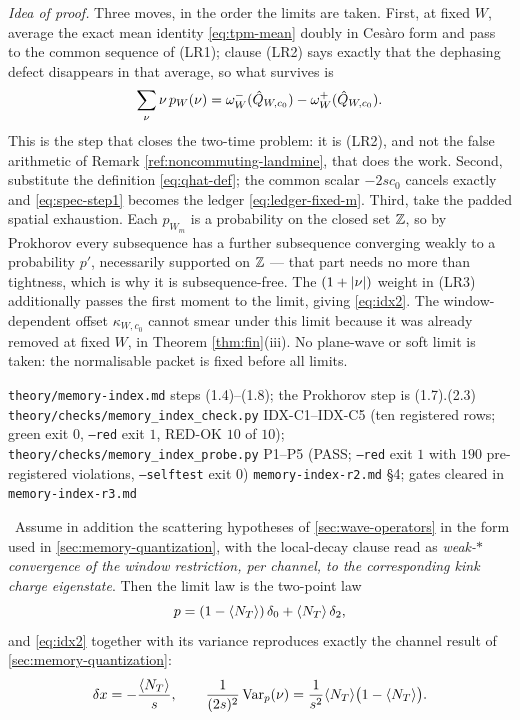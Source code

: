 \emph{Idea of proof.} Three moves, in the order the limits are taken. First,
at fixed $W$, average the exact mean identity \eqref{eq:tpm-mean} doubly in
Cesàro form and pass to the common sequence of (LR1); clause (LR2) says
exactly that the dephasing defect disappears in that average, so what
survives is
\begin{equation}
  \sum_\nu \nu\,p_W(\nu)
   =\omega^{-}_{W}(\hat{Q}_{W,c_0})-\omega^{+}_{W}(\hat{Q}_{W,c_0}).
  \label{eq:spec-step1}
\end{equation}
This is the step that closes the two-time problem: it is (LR2), and not the
false arithmetic of Remark \ref{ref:noncommuting-landmine}, that does the
work. Second, substitute the definition \eqref{eq:qhat-def}; the common
scalar $-2sc_0$ cancels exactly and \eqref{eq:spec-step1} becomes the ledger
\eqref{eq:ledger-fixed-m}. Third, take the padded spatial exhaustion. Each
$p_{W_m}$ is a probability on the closed set $\mathbb{Z}$, so by Prokhorov every
subsequence has a further subsequence converging weakly to a probability
$p'$, necessarily supported on $\mathbb{Z}$ --- that part needs no more than
tightness, which is why it is subsequence-free. The $(1+\lvert \nu\rvert)$ weight in
(LR3) additionally passes the first moment to the limit, giving
\eqref{eq:idx2}. The window-dependent offset $\kappa_{W,c_0}$ cannot smear
under this limit because it was already removed at fixed $W$, in Theorem
\ref{thm:fin}(iii). No plane-wave or soft limit is taken: the normalisable
packet is fixed before all limits.

{\texttt{theory/memory-index.md} steps (1.4)--(1.8); the Prokhorov step is
 (1.7).(2.3)}
{\texttt{theory/checks/memory\_index\_check.py} IDX-C1--IDX-C5 (ten
 registered rows; green exit $0$, \texttt{--red} exit $1$, RED-OK $10$ of
 $10$); \texttt{theory/checks/memory\_index\_probe.py} P1--P5 (PASS;
 \texttt{--red} exit $1$ with $190$ pre-registered violations,
 \texttt{--selftest} exit $0$)}
{\texttt{memory-index-r2.md} \S4; gates cleared in
 \texttt{memory-index-r3.md}}

\begin{corollary}
\label{thm:reduction-had}
\statusProvedConditional\
Assume in addition the scattering hypotheses of \cref{sec:wave-operators} in
the form used in \cref{sec:memory-quantization}, with the local-decay clause
read as \emph{weak-$*$ convergence of the window restriction, per channel, to
the corresponding kink charge eigenstate}. Then the limit law is the
two-point law
\begin{equation}
  p=(1-\langle N_T\rangle)\,\delta_0+\langle N_T\rangle\,\delta_2 ,
  \label{eq:two-point}
\end{equation}
and \eqref{eq:idx2} together with its variance reproduces exactly the channel
result of \cref{sec:memory-quantization}:
\begin{equation}
  \delta x=-\frac{\langle N_T\rangle}{s},
  \qquad
  \frac{1}{(2s)^2}\operatorname{Var}_p(\nu)
    =\frac{1}{s^{2}}\langle N_T\rangle\bigl(1-\langle N_T\rangle\bigr).
  \label{eq:reduction}
\end{equation}
\end{corollary}

